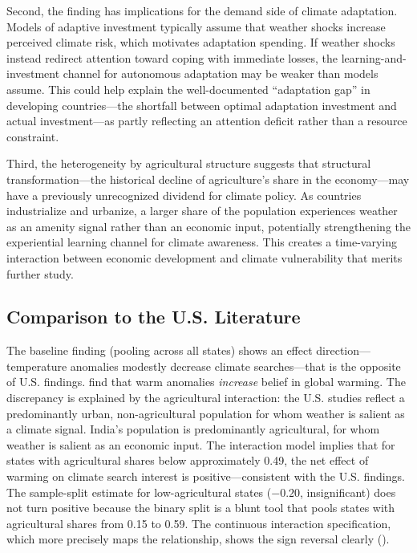 \documentclass[12pt]{article}
\begin{document}
Second, the finding has implications for the demand side of climate adaptation. Models of adaptive investment typically assume that weather shocks increase perceived climate risk, which motivates adaptation spending. If weather shocks instead redirect attention toward coping with immediate losses, the learning-and-investment channel for autonomous adaptation may be weaker than models assume. This could help explain the well-documented ``adaptation gap'' in developing countries---the shortfall between optimal adaptation investment and actual investment---as partly reflecting an attention deficit rather than a resource constraint.

Third, the heterogeneity by agricultural structure suggests that structural transformation---the historical decline of agriculture's share in the economy---may have a previously unrecognized dividend for climate policy. As countries industrialize and urbanize, a larger share of the population experiences weather as an amenity signal rather than an economic input, potentially strengthening the experiential learning channel for climate awareness. This creates a time-varying interaction between economic development and climate vulnerability that merits further study.

\subsection{Comparison to the U.S. Literature}

The baseline finding (pooling across all states) shows an effect direction---temperature anomalies modestly decrease climate searches---that is the opposite of U.S. findings. \citet{eganmullin2012} find that warm anomalies \textit{increase} belief in global warming. The discrepancy is explained by the agricultural interaction: the U.S. studies reflect a predominantly urban, non-agricultural population for whom weather is salient as a climate signal. India's population is predominantly agricultural, for whom weather is salient as an economic input. The interaction model implies that for states with agricultural shares below approximately 0.49, the net effect of warming on climate search interest is positive---consistent with the U.S. findings. The sample-split estimate for low-agricultural states ($-0.20$, insignificant) does not turn positive because the binary split is a blunt tool that pools states with agricultural shares from 0.15 to 0.59. The continuous interaction specification, which more precisely maps the relationship, shows the sign reversal clearly ().
\end{document}
